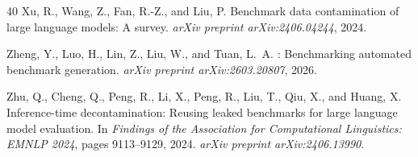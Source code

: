 \documentclass[11pt,a4paper]{article}
\begin{document}
\begin{thebibliography}{40}
Xu, R., Wang, Z., Fan, R.-Z., and Liu, P.
\newblock Benchmark data contamination of large language models: A survey.
\newblock \emph{arXiv preprint arXiv:2406.04244}, 2024.

Zheng, Y., Luo, H., Lin, Z., Liu, W., and Tuan, L.~A.
: Benchmarking automated benchmark generation.
\newblock \emph{arXiv preprint arXiv:2603.20807}, 2026.

Zhu, Q., Cheng, Q., Peng, R., Li, X., Peng, R., Liu, T., Qiu, X., and Huang, X.
\newblock Inference-time decontamination: Reusing leaked benchmarks for large language model evaluation.
\newblock In \emph{Findings of the Association for Computational Linguistics: EMNLP 2024}, pages 9113--9129, 2024.
\newblock \emph{arXiv preprint arXiv:2406.13990}.

\end{thebibliography}
\end{document}
